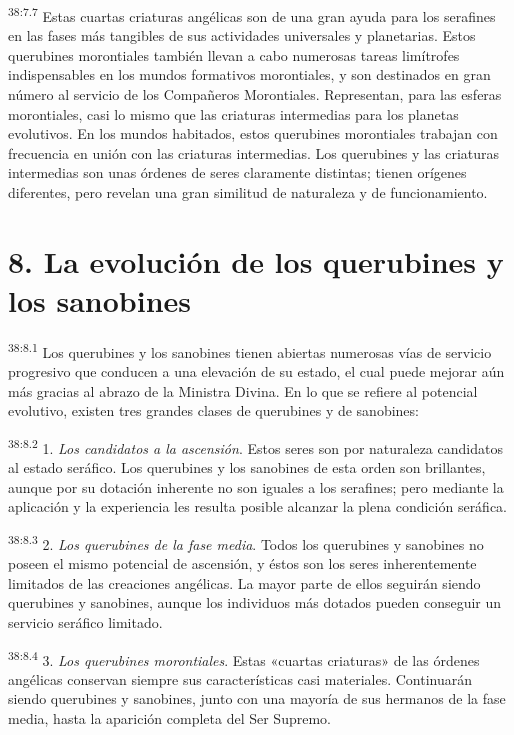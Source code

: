 \par
\textsuperscript{38:7.7} Estas cuartas criaturas angélicas son de una gran ayuda para los serafines en las fases más tangibles de sus actividades universales y planetarias. Estos querubines morontiales también llevan a cabo numerosas tareas limítrofes indispensables en los mundos formativos morontiales, y son destinados en gran número al servicio de los Compañeros Morontiales. Representan, para las esferas morontiales, casi lo mismo que las criaturas intermedias para los planetas evolutivos. En los mundos habitados, estos querubines morontiales trabajan con frecuencia en unión con las criaturas intermedias. Los querubines y las criaturas intermedias son unas órdenes de seres claramente distintas; tienen orígenes diferentes, pero revelan una gran similitud de naturaleza y de funcionamiento.

\section*{8. La evolución de los querubines y los sanobines}
\par
\textsuperscript{38:8.1} Los querubines y los sanobines tienen abiertas numerosas vías de servicio progresivo que conducen a una elevación de su estado, el cual puede mejorar aún más gracias al abrazo de la Ministra Divina. En lo que se refiere al potencial evolutivo, existen tres grandes clases de querubines y de sanobines:

\par
\textsuperscript{38:8.2} 1. \textit{Los candidatos a la ascensión}. Estos seres son por naturaleza candidatos al estado seráfico. Los querubines y los sanobines de esta orden son brillantes, aunque por su dotación inherente no son iguales a los serafines; pero mediante la aplicación y la experiencia les resulta posible alcanzar la plena condición seráfica.

\par
\textsuperscript{38:8.3} 2. \textit{Los querubines de la fase media}. Todos los querubines y sanobines no poseen el mismo potencial de ascensión, y éstos son los seres inherentemente limitados de las creaciones angélicas. La mayor parte de ellos seguirán siendo querubines y sanobines, aunque los individuos más dotados pueden conseguir un servicio seráfico limitado.

\par
\textsuperscript{38:8.4} 3. \textit{Los querubines morontiales}. Estas «cuartas criaturas» de las órdenes angélicas conservan siempre sus características casi materiales. Continuarán siendo querubines y sanobines, junto con una mayoría de sus hermanos de la fase media, hasta la aparición completa del Ser Supremo.

